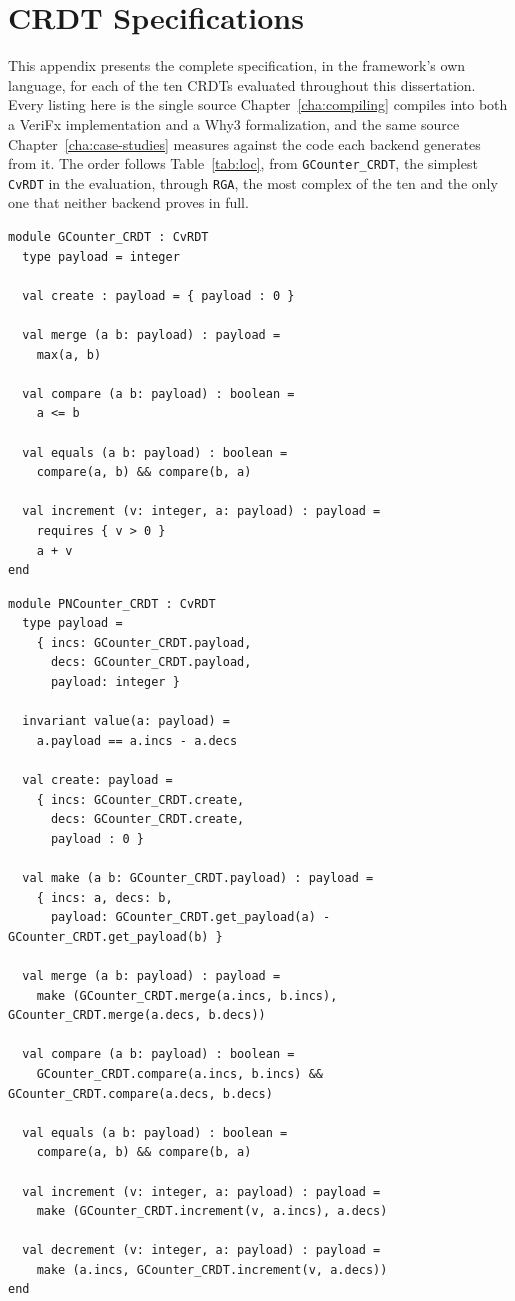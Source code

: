 %

\chapter{CRDT Specifications}
\label{app:crdt_specifications}

This appendix presents the complete specification, in the framework's own language, for each of the ten CRDTs evaluated
throughout this dissertation. Every listing here is the single source Chapter~\ref{cha:compiling} compiles into both a
VeriFx implementation and a Why3 formalization, and the same source Chapter~\ref{cha:case-studies} measures against the
code each backend generates from it. The order follows Table~\ref{tab:loc}, from \texttt{GCounter\_CRDT}, the simplest
\texttt{CvRDT} in the evaluation, through \texttt{RGA}, the most complex of the ten and the only one that neither backend
proves in full.

\begin{lstlisting}[caption={\texttt{GCounter\_CRDT}}, label={lst:app_gcounter}]
module GCounter_CRDT : CvRDT
  type payload = integer

  val create : payload = { payload : 0 }

  val merge (a b: payload) : payload =
    max(a, b)

  val compare (a b: payload) : boolean =
    a <= b

  val equals (a b: payload) : boolean =
    compare(a, b) && compare(b, a)

  val increment (v: integer, a: payload) : payload =
    requires { v > 0 }
    a + v
end
\end{lstlisting}

\begin{lstlisting}[caption={\texttt{PNCounter\_CRDT}}, label={lst:app_pncounter}]
module PNCounter_CRDT : CvRDT
  type payload =
    { incs: GCounter_CRDT.payload,
      decs: GCounter_CRDT.payload,
      payload: integer }

  invariant value(a: payload) =
    a.payload == a.incs - a.decs

  val create: payload =
    { incs: GCounter_CRDT.create,
      decs: GCounter_CRDT.create,
      payload : 0 }

  val make (a b: GCounter_CRDT.payload) : payload =
    { incs: a, decs: b,
      payload: GCounter_CRDT.get_payload(a) - GCounter_CRDT.get_payload(b) }

  val merge (a b: payload) : payload =
    make (GCounter_CRDT.merge(a.incs, b.incs), GCounter_CRDT.merge(a.decs, b.decs))

  val compare (a b: payload) : boolean = 
    GCounter_CRDT.compare(a.incs, b.incs) && GCounter_CRDT.compare(a.decs, b.decs)

  val equals (a b: payload) : boolean =
    compare(a, b) && compare(b, a)

  val increment (v: integer, a: payload) : payload =
    make (GCounter_CRDT.increment(v, a.incs), a.decs)

  val decrement (v: integer, a: payload) : payload =
    make (a.incs, GCounter_CRDT.increment(v, a.decs))
end
\end{lstlisting}

